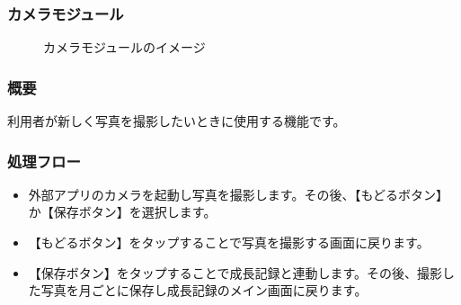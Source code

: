 \documentclass[a4j]{jarticle}
\begin{document}
\subsubsection{カメラモジュール\label{camera}}
\begin{figure}[H]
    \begin{center}
    \caption {カメラモジュールのイメージ}
    \label{functionselection}
    \end{center}
\end{figure}

\subsubsection*{概要}
利用者が新しく写真を撮影したいときに使用する機能です。

\subsubsection*{処理フロー}
\begin{itemize}
\item 外部アプリのカメラを起動し写真を撮影します。その後、【もどるボタン】か【保存ボタン】を選択します。
\item 【もどるボタン】をタップすることで写真を撮影する画面に戻ります。
\item 【保存ボタン】をタップすることで成長記録と連動します。その後、撮影した写真を月ごとに保存し成長記録のメイン画面に戻ります。
\end{itemize}
\end{document}
